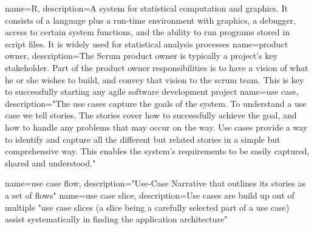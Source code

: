 {
  name={R},
  description={A system for statistical computation and graphics. It consists of a language plus a run-time environment with graphics, a debugger, access to certain system functions, and the ability to run programs stored in script files. It is widely used for statistical analysis processes \cite{R}}
}
{
  name={product owner},
  description={The Scrum product owner is typically a project's key stakeholder. Part of the product owner responsibilities is to have a vision of what he or she wishes to build, and convey that vision to the scrum team. This is key to successfully starting any agile software development project \cite{product_owner}}
}
{
  name={use case},
  description={"The use cases capture the goals of the system. To understand a use case we tell stories. The stories cover how to successfully achieve the goal, and how to handle any problems that may occur on the way. Use cases provide a way to identify and capture all the different but related stories in a simple but comprehensive way. This enables the system’s requirements to be easily captured, shared and understood." \cite{jacobson2011usecase}}
  }

{
  name={use case flow},
  description={"Use-Case Narrative that outlines its stories as a set of flows" \cite{jacobson2011usecase}}
}
{
  name={use case slice},
  description={Use cases are build up out of multiple "use case slices (a slice being a carefully selected part of a use case) assist systematically in finding the application architecture" \cite{jacobson2011usecase}}
}



\printglossaries

\newpage